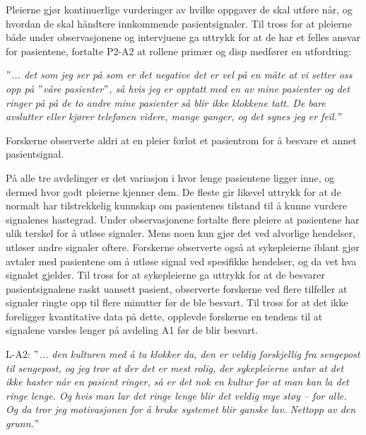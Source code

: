 \noindent
Pleierne gjør kontinuerlige vurderinger av hvilke oppgaver de skal utføre når, og hvordan de skal håndtere innkommende pasientsignaler. Til tross for at pleierne både under observasjonene og intervjuene ga uttrykk for at de har et felles ansvar for pasientene, fortalte P2-A2 at rollene primær og disp medfører en utfordring:

\noindent
\textit{$"$... det som jeg ser på som er det negative det er vel på en måte at vi setter oss opp på $"$våre pasienter$"$, så hvis jeg er opptatt med en av mine pasienter og det ringer på på de to andre mine pasienter så blir ikke klokkene tatt. De bare avslutter eller kjører telefonen videre, mange ganger, og det synes jeg er feil.$"$}

\noindent
Forskerne observerte aldri at en pleier forlot et pasientrom for å besvare et annet pasientsignal.

\noindent
På alle tre avdelinger er det variasjon i hvor lenge pasientene ligger inne, og dermed hvor godt pleierne kjenner dem. De fleste gir likevel uttrykk for at de normalt har tilstrekkelig kunnskap om pasientenes tilstand til å kunne vurdere signalenes hastegrad. Under observasjonene fortalte flere pleiere at pasientene har ulik terskel for å utløse signaler. Mens noen kun gjør det ved alvorlige hendelser, utløser andre signaler oftere. Forskerne observerte også at sykepleierne iblant gjør avtaler med pasientene om å utløse signal ved spesifikke hendelser, og da vet hva signalet gjelder. Til tross for at sykepleierne ga uttrykk for at de besvarer pasientsignalene raskt uansett pasient, observerte forskerne ved flere tilfeller at signaler ringte opp til flere minutter før de ble besvart. Til tross for at det ikke foreligger kvantitative data på dette, opplevde forskerne en tendens til at signalene varsles lenger på avdeling A1 før de blir besvart.  
  
\noindent
L-A2: \textit{$"$... den kulturen med å ta klokker da, den er veldig forskjellig fra sengepost til sengepost, og jeg tror at der det er mest rolig, der sykepleierne antar at det ikke haster når en pasient ringer, så er det nok en kultur for at man kan la det ringe lenge. Og hvis man lar det ringe lenge blir det veldig mye støy – for alle. Og da tror jeg motivasjonen for å bruke systemet blir ganske lav. Nettopp av den grunn.$"$}

